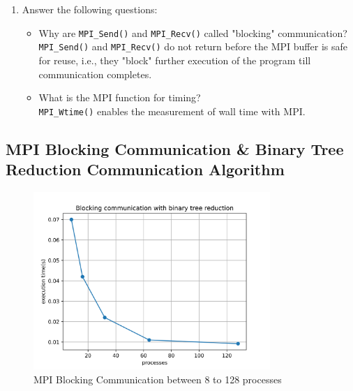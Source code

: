 \documentclass[12pt]{article}
\begin{document}
\begin{enumerate}
    \item Answer the following questions:
    \begin{itemize}
        \item Why are \texttt{MPI\_Send()} and \texttt{MPI\_Recv()} called "blocking" communication?\\
         \texttt{MPI\_Send()} and \texttt{MPI\_Recv()} do not return before the MPI buffer is safe for reuse, i.e., they "block" further execution of the program till communication completes.
        \item What is the MPI function for timing?\\
        \texttt{MPI\_Wtime()} enables the measurement of wall time with MPI.
    \end{itemize}
\end{enumerate}

\subsection{MPI Blocking Communication \& Binary Tree Reduction Communication Algorithm}

\begin{figure}[H]
  \centering
  \includegraphics[width=0.8\textwidth]{graph-pi-bin-blocking.png}
  \caption{MPI Blocking Communication between 8 to 128 processes}
  \label{fig:blocking}
\end{figure}

\end{document}
